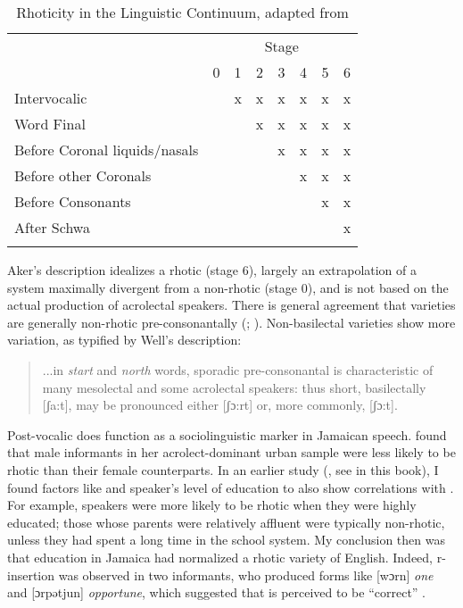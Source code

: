 \begin{table} %
\begin{tabular}{l*{7}{c}}
\lsptoprule
& \multicolumn{7}{c}{Stage}\\\cmidrule(lr){2-8}
                                    & 0 & 1 & 2 & 3 & 4 & 5 & 6\\\midrule
Intervocalic                        &   & x & x & x & x & x & x\\
Word Final                          &   &   & x & x & x & x & x\\
Before Coronal liquids\slash nasals &   &   &   & x & x & x & x\\
Before other Coronals               &   &   &   &  & x & x & x\\ 
Before Consonants                   &   &   &   &  &   & x & x\\ 
After Schwa                         &   &   &   &  &   &   & x\\  
\lspbottomrule
\end{tabular}
\caption{Rhoticity in the Linguistic Continuum, adapted from \citet[73]{Akers1981}\label{tab:2.11}}
\end{table}

Aker’s description idealizes a rhotic  (stage 6), largely an extrapolation of a system maximally divergent from a non-rhotic  (stage 0), and is not based on the actual production of acrolectal speakers.  There is general agreement that  varieties are generally non-rhotic pre-consonantally (\citealt[184]{Beckford-Wassink1999a}; \citealt[577]{Wells1982c}).  Non-basilectal varieties show more variation, as typified by Well’s description:

\begin{quote}
	...in \textit{start} and \textit{north} words, sporadic pre-consonantal  is characteristic of many mesolectal and some acrolectal speakers: thus short, basilectally [ʃa:t], may be pronounced either [ʃɔ:rt] or, more commonly, [ʃɔ:t]. 
\end{quote}

Post-vocalic  does function as a sociolinguistic marker in Jamaican speech.  \citet{Beckford-Wassink1999a} found that male informants in her acrolect-dominant urban sample were less likely to be rhotic than their female counterparts.  In an earlier study (\citealt[142]{Irvine1988}, see  in this book), I found factors like  and speaker’s level of education to also show correlations with .  For example, speakers were more likely to be rhotic when they were highly educated; those whose parents were relatively affluent were typically non-rhotic, unless they had spent a long time in the school system.  My conclusion then was that education in Jamaica had normalized a rhotic variety of English.  Indeed, r-insertion was observed in two informants, who produced forms like [wɔrn] \textit{one} and [ɔrpǝtjun] \textit{opportune}, which suggested that  is perceived to be “correct” .  

